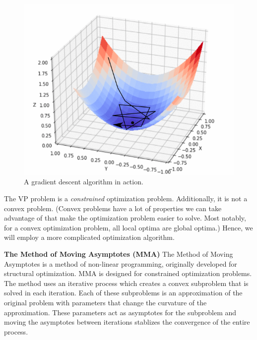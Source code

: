 \documentclass[final]{beamer}
\begin{document}
\begin{frame}
	\begin{figure}
		\centering
		\includegraphics[height=0.75\textheight]{fastlr.png}
		\caption{A gradient descent algorithm in action. \cite{kathuria_2020}}
	\end{figure}
\end{frame}

\begin{frame}{}
	The VP problem is a \textit{constrained} optimization problem.\vfill\pause
	Additionally, it is not a convex problem.\vfill\pause
	(Convex problems have a lot of properties we can take advantage of that make the optimization problem easier to solve. Most notably, for a convex optimization problem, all local optima are global optima.)\vfill\pause
	Hence, we will employ a more complicated optimization algorithm.\vfill
\end{frame}

\begin{frame}[t]{\textbf{The Method of Moving Asymptotes (MMA)}}
	 The Method of Moving Asymptotes is a method of non-linear programming, originally developed for structural optimization. MMA is designed for constrained optimization problems.
	 \vfill\pause
	 The method uses an iterative process which creates a convex subproblem that is solved in each iteration. Each of these subproblems is an approximation of the original problem with parameters that change the curvature of the approximation.
	 \vfill\pause
	 These parameters act as asymptotes for the subproblem and moving the asymptotes between iterations stablizes the convergence of the entire process.
\end{frame}
\end{document}
